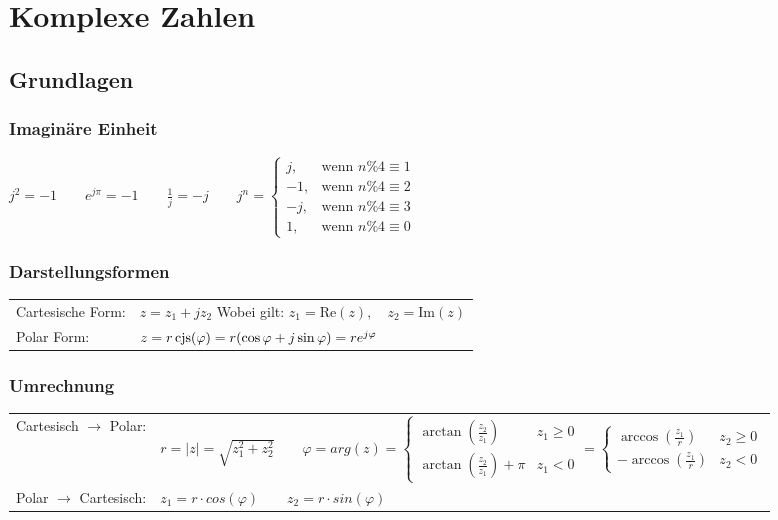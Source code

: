 \section{Komplexe Zahlen}
\subsection{Grundlagen}
\subsubsection{Imaginäre Einheit}
$j^2 = -1 \qquad e^{j\pi} = -1 \qquad \frac{1}{j} = -j \qquad   j^n =
																\begin{cases} j,  & \text{wenn } n \% 4 \equiv 1 \\
													            -1, & \text{wenn } n \% 4 \equiv 2 \\
													            -j, & \text{wenn } n \% 4 \equiv 3 \\
													            1,  & \text{wenn } n \% 4 \equiv 0 
													          	\end{cases}$

\subsubsection{Darstellungsformen}
\begin{tabular}{ll}
	Cartesische Form: & $z = z_1 + j z_2$ \quad Wobei gilt: $z_1 = \text{Re}(z),
	\quad z_2 = \text{Im}(z)$ \\
	Polar Form: &   $z = r \operatorname{cjs}(\varphi) = r(\cos{\varphi} + j\sin{\varphi}) = r
	e^{j \varphi}$ 	\\
\end{tabular}
\subsubsection{Umrechnung}
\begin{tabular}{ll}
	Cartesisch $\rightarrow$ Polar: & $r = |z| = \sqrt{z_1^2 + z_2^2} \qquad   
		\varphi = arg(z) 
		        = 	\begin{cases} 
                       	\arctan(\frac{z_2}{z_1}) &z_1 \geq 0\\
                  		\arctan(\frac{z_2}{z_1}) + \pi &z_1 < 0
          			\end{cases}
          		=	\begin{cases}
          				\arccos(\frac{z_1}{r}) & z_2 \geq 0 \\
          				-\arccos(\frac{z_1}{r}) & z_2 < 0          		
          			\end{cases}$ \\
          			
	Polar $\rightarrow$ Cartesisch: & $z_1 = r \cdot cos(\varphi) \qquad z_2 = r
	\cdot sin(\varphi)$ \\
\end{tabular}



